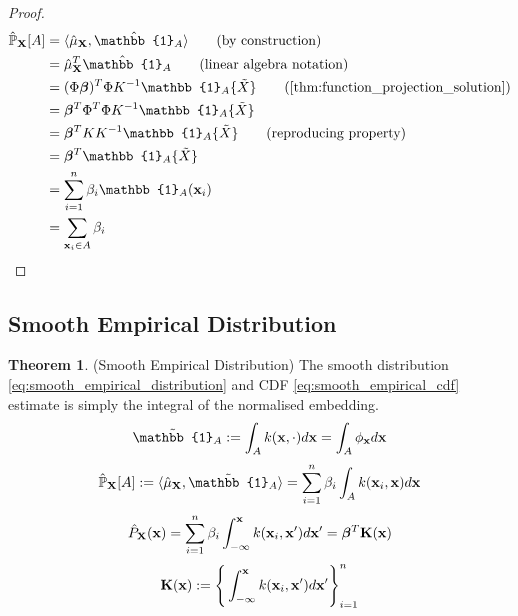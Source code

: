 \documentclass[twoside]{article} \usepackage{aistats2017}
\theoremstyle{definition}
\theoremstyle{theorem}
\newtheorem{theorem}{Theorem}[section]
\newcommand{\rv}[1]{{#1}}
\newcommand{\ds}[1]{\tilde{#1}}
\newcommand{\inner}[2]{{\langle #1, #2 \rangle}}
\begin{document}
		\begin{proof}
			\begin{align*}
					\hat{\mathbb{P}}_{\bvec{\rv{X}}}[A] &= \inner{\hat{\mu}_{\bvec{\rv{X}}}}{ \hat{\mathbb{1}}_{A}} \tag{by construction} \\
					&= \hat{\mu}_{\bvec{\rv{X}}}^{T}\hat{\mathbb{1}}_{A} \tag{linear algebra notation} \\
					&= (\Phi \bm{\beta})^{T} \Phi K^{-1} \mathbb{1}_{A}\{\ds{X}\} \tag{\cref{thm:function_projection_solution}} \\
					&= \bm{\beta}^{T} \Phi^{T} \Phi K^{-1} \mathbb{1}_{A}\{\ds{X}\} \\
					&= \bm{\beta}^{T} K K^{-1} \mathbb{1}_{A}\{\ds{X}\} \tag{reproducing property} \\
					&= \bm{\beta}^{T} \mathbb{1}_{A}\{\ds{X}\} \\
					&= \sum_{i = 1}^{n} \beta_{i} \mathbb{1}_{A}(\bvec{x}_{i}) \\
					&= \sum_{\bvec{x}_{i} \in A} \beta_{i}
			\end{align*}
		\end{proof}
		
	\subsection{Smooth Empirical Distribution}
	\label{sec:derivations:smooth_empirical_distribution}
		
		\begin{theorem} \label{thm:smooth_empirical_distribution_and_cdf}
			(Smooth Empirical Distribution)
			The smooth distribution \eqref{eq:smooth_empirical_distribution} and CDF \eqref{eq:smooth_empirical_cdf} estimate is simply the integral of the normalised embedding.
			\begin{equation}
				\tilde{\mathbb{1}}_{A} := \int_{A} k(\bvec{x}, \cdot) d\bvec{x} = \int_{A} \phi_{\bvec{x}} d\bvec{x}
			\label{eq:indicator_smooth}
			\end{equation}
			\begin{equation}
				\hat{\mathbb{P}}_{\bvec{\rv{X}}}[A] := \inner{\hat{\mu}_{\bvec{\rv{X}}}}{\tilde{\mathbb{1}}_{A}} = \sum_{i = 1}^{n} \beta_{i} \int_{A}  k(\bvec{x}_{i}, \bvec{x}) d\bvec{x}
			\label{eq:smooth_empirical_distribution}
			\end{equation}	
			\begin{equation}
				\hat{P}_{\bvec{\rv{X}}}(\bvec{x}) = \sum_{i = 1}^{n} \beta_{i} \int_{-\bvec{\infty}}^{\bvec{x}}  k(\bvec{x}_{i}, \bvec{x}') d\bvec{x}' = \bm{\beta}^{T} \bvec{K}(\bvec{x})
			\label{eq:smooth_empirical_cdf}
			\end{equation}
			\begin{equation}
				\mathbf{K}(\mathbf{x}) := \Bigg\{ \int_{-\mathbf{\infty}}^{\mathbf{x}}  k(\mathbf{x}_{i}, \mathbf{x}') d\mathbf{x}' \Bigg\}_{i = 1}^{n}
			\label{eq:kernel_integral}
			\end{equation}
		\end{theorem}
			
\end{document}
